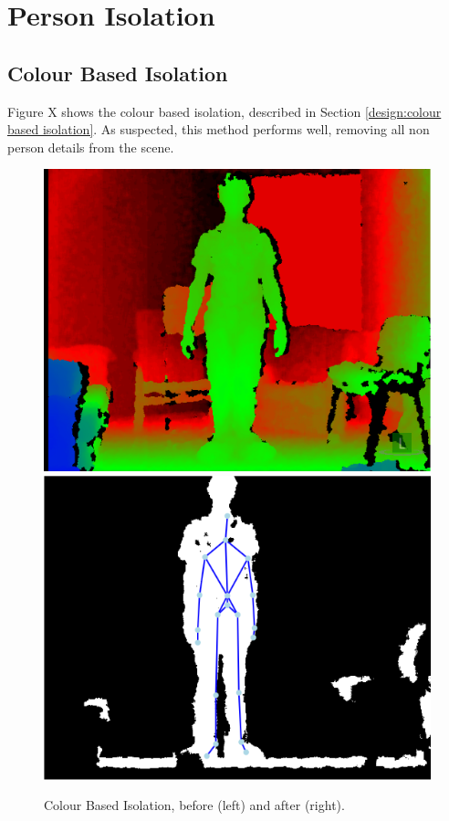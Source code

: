 \section{Person Isolation}
\label{testing:person isolation}

\subsection{Colour Based Isolation}
\label{testing:colour based isolation}
Figure X shows the colour based isolation, described in Section \ref{design:colour based isolation}.
As suspected, this method performs well, removing all non person  details from the scene.\\

\begin{figure}[h]
\begin{center}
\includegraphics[scale=0.4]{./design/parse1} 
\includegraphics[scale=0.4]{./design/parse2}
\end{center}
\caption{Colour Based Isolation, before (left) and after (right).}
\label{fig:colour based cut off}
\end{figure} 

